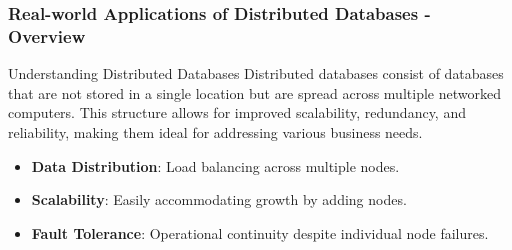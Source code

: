 \documentclass[aspectratio=169]{beamer}
\begin{document}
\begin{frame}[fragile]
    \frametitle{Real-world Applications of Distributed Databases - Overview}
    \begin{block}{Understanding Distributed Databases}
        Distributed databases consist of databases that are not stored in a single location but are spread across multiple networked computers. This structure allows for improved scalability, redundancy, and reliability, making them ideal for addressing various business needs.
    \end{block}
    \begin{itemize}
        \item \textbf{Data Distribution}: Load balancing across multiple nodes.
        \item \textbf{Scalability}: Easily accommodating growth by adding nodes.
        \item \textbf{Fault Tolerance}: Operational continuity despite individual node failures.
    \end{itemize}
\end{frame}
\end{document}
